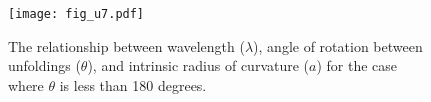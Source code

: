 %

\begin{figure}[!h]
  \centering
  \texttt{[image: fig\_u7.pdf]}
  \caption{The relationship between wavelength ($\lambda$), angle of rotation between unfoldings ($\theta$), and intrinsic radius of curvature ($a$) for the case  where $\theta$  is less than 180 degrees.}
  \label{fig:unf7}
\end{figure}

%

